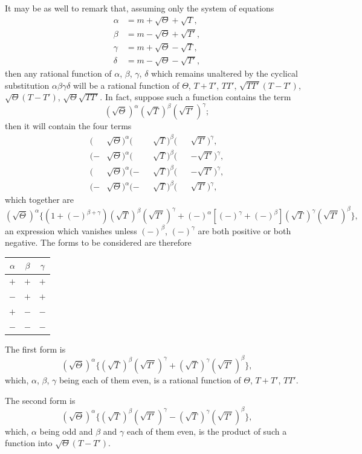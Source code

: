 \documentclass[11pt,a4paper]{article}
\theoremstyle{plain}
\begin{document}
It may be as well to remark that, assuming only the system of equations
\begin{align*}
\alpha &= m + \sqrt{\Theta} + \sqrt{T}, \\
\beta &= m - \sqrt{\Theta} + \sqrt{T'}, \\
\gamma &= m + \sqrt{\Theta} - \sqrt{T}, \\
\delta &= m - \sqrt{\Theta} - \sqrt{T'},
\end{align*}
then any rational function of $\alpha$, $\beta$, $\gamma$, $\delta$ which remains unaltered by the cyclical substitution $\alpha\beta\gamma\delta$ will be a rational function of $\Theta$, $T+T'$, $TT'$, $\sqrt{TT'}(T-T')$, $\sqrt{\Theta}(T-T')$, $\sqrt{\Theta}\sqrt{TT'}$. In fact, suppose such a function contains the term
\[
(\sqrt{\Theta})^\alpha (\sqrt{T})^\beta (\sqrt{T'})^\gamma;
\]
then it will contain the four terms
\begin{align*}
(&\sqrt{\Theta})^\alpha (&&\sqrt{T})^\beta (&&\sqrt{T'})^\gamma, \\
(-&\sqrt{\Theta})^\alpha (&&\sqrt{T})^\beta (&&-\sqrt{T'})^\gamma, \\
(&\sqrt{\Theta})^\alpha (-&&\sqrt{T})^\beta (&&-\sqrt{T'})^\gamma, \\
(-&\sqrt{\Theta})^\alpha (-&&\sqrt{T})^\beta (&&\sqrt{T'})^\gamma,
\end{align*}
which together are
\[
(\sqrt{\Theta})^\alpha \{(1 + (-)^{\beta+\gamma})(\sqrt{T})^\beta (\sqrt{T'})^\gamma + (-)^\alpha [(-)^\gamma + (-)^\beta](\sqrt{T})^\gamma (\sqrt{T'})^\beta\},
\]
an expression which vanishes unless $(-)^\beta$, $(-)^\gamma$ are both positive or both negative. The forms to be considered are therefore
\begin{center}
\begin{tabular}{c|c|c}
$\alpha$ & $\beta$ & $\gamma$ \\
\hline
$+$ & $+$ & $+$ \\
$-$ & $+$ & $+$ \\
$+$ & $-$ & $-$ \\
$-$ & $-$ & $-$ \\
\end{tabular}
\end{center}

The first form is
\[
(\sqrt{\Theta})^\alpha \{(\sqrt{T})^\beta (\sqrt{T'})^\gamma + (\sqrt{T})^\gamma (\sqrt{T'})^\beta\},
\]
which, $\alpha$, $\beta$, $\gamma$ being each of them even, is a rational function of $\Theta$, $T+T'$, $TT'$.

The second form is
\[
(\sqrt{\Theta})^\alpha \{(\sqrt{T})^\beta (\sqrt{T'})^\gamma - (\sqrt{T})^\gamma (\sqrt{T'})^\beta\},
\]
which, $\alpha$ being odd and $\beta$ and $\gamma$ each of them even, is the product of such a function into $\sqrt{\Theta}(T-T')$.
\end{document}

